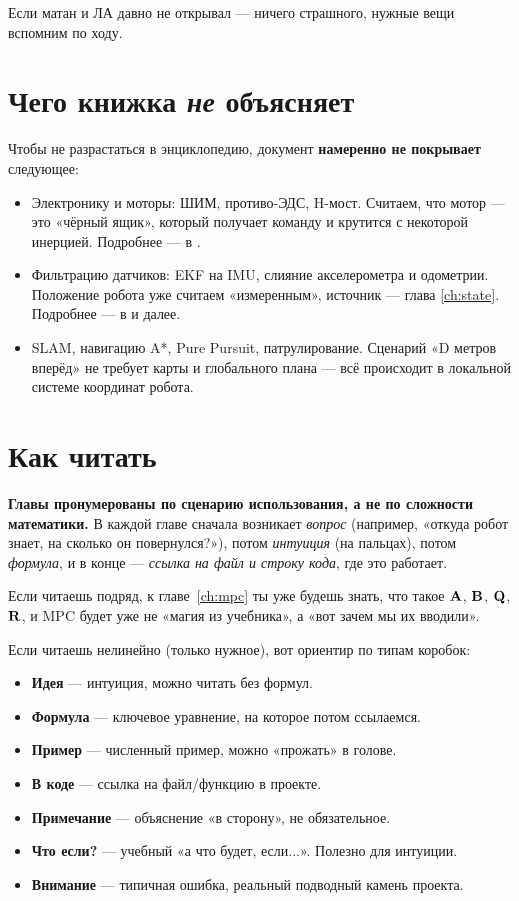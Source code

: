 Если матан и ЛА давно не открывал --- ничего страшного, нужные вещи
вспомним по ходу.

\section{Чего книжка \emph{не} объясняет}

Чтобы не разрастаться в энциклопедию, документ \textbf{намеренно не покрывает}
следующее:

\begin{itemize}
  \item Электронику и моторы: ШИМ, противо-ЭДС, H-мост. Считаем, что
        мотор --- это «чёрный ящик», который получает команду и крутится
        с некоторой инерцией. Подробнее --- в .
  \item Фильтрацию датчиков: EKF на IMU, слияние акселерометра и одометрии.
        Положение робота уже считаем «измеренным», источник --- глава
        \ref{ch:state}. Подробнее --- в 
        и далее.
  \item SLAM, навигацию A*, Pure Pursuit, патрулирование. Сценарий «D метров
        вперёд» не требует карты и глобального плана --- всё происходит
        в локальной системе координат робота.
\end{itemize}

\section{Как читать}

\textbf{Главы пронумерованы по сценарию использования, а не по сложности
математики.} В каждой главе сначала возникает \emph{вопрос} (например, «откуда
робот знает, на сколько он повернулся?»), потом \emph{интуиция} (на пальцах),
потом \emph{формула}, и в конце --- \emph{ссылка на файл и строку кода},
где это работает.

Если читаешь подряд, к главе~\ref{ch:mpc} ты уже будешь знать, что такое
$\mathbf{A}$, $\mathbf{B}$, $\mathbf{Q}$, $\mathbf{R}$, и MPC будет уже не «магия из
учебника», а «вот зачем мы их вводили».

Если читаешь нелинейно (только нужное), вот ориентир по типам коробок:

\begin{itemize}
  \item \textbf{Идея} --- интуиция, можно читать без формул.
  \item \textbf{Формула} --- ключевое уравнение, на которое потом ссылаемся.
  \item \textbf{Пример} --- численный пример, можно «прожать» в голове.
  \item \textbf{В коде} --- ссылка на файл/функцию в проекте.
  \item \textbf{Примечание} --- объяснение «в сторону», не обязательное.
  \item \textbf{Что если?} --- учебный «а что будет, если...». Полезно для
        интуиции.
  \item \textbf{Внимание} --- типичная ошибка, реальный подводный камень
        проекта.
\end{itemize}

